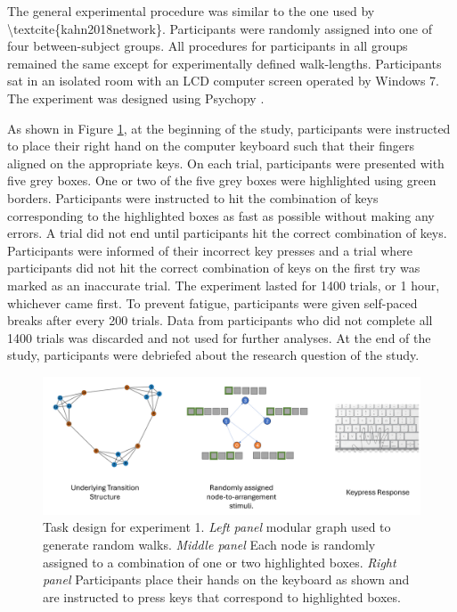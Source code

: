 \ac{The general experimental procedure was similar to the one used by \textcite{kahn2018network}}. Participants were randomly assigned into one of four between-subject groups. All procedures for participants in all groups remained the same except for experimentally defined walk-lengths. Participants sat in an isolated room with an LCD computer screen operated by Windows 7. The experiment was designed using Psychopy \cite{peirce2007psychopy}. 

As shown in Figure \ref{fig:exp1-design}, at the beginning of the study, participants were instructed to place their right hand on the computer keyboard such that their fingers aligned on the appropriate keys. On each trial, participants were presented with five grey boxes. One or two of the five grey boxes were highlighted using green borders. Participants were instructed to hit the combination of keys  corresponding to the highlighted boxes as fast as possible without making any errors. A trial did not end until participants hit the correct combination of keys. Participants were informed of their incorrect key presses and a trial where participants did not hit the correct combination of keys on the first try was marked as an inaccurate trial. The experiment lasted for 1400 trials, or 1 hour, whichever came first. To prevent fatigue, participants were given self-paced breaks after every 200 trials. Data from participants who did not complete all 1400 trials was discarded and not used for further analyses. At the end of the study, participants were debriefed about the research question of the study.

\begin{figure}
	\centering
	\includegraphics[width = \textwidth]{chapter_notebooks/chapter_2/figures/exp1_task_design.png}
	\caption{Task design for experiment 1. \textit{Left panel} modular graph used to generate random walks. \textit{Middle panel} Each node is randomly assigned to a combination of one or two highlighted boxes. \textit{Right panel} Participants place their hands on the keyboard as shown and are instructed to press keys that correspond to highlighted boxes.}
	\label{fig:exp1-design}
\end{figure}

